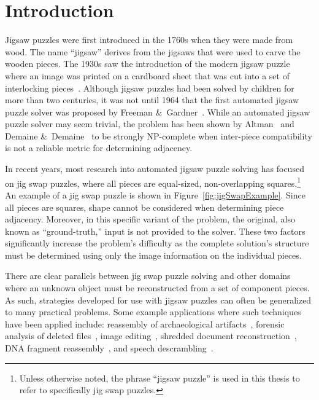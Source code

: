 \chapter{Introduction}\label{sec:introduction}

Jigsaw puzzles were first introduced in the 1760s when they were made from wood.  The name ``jigsaw'' derives from the jigsaws that were used to carve the wooden pieces.   The 1930s saw the introduction of the modern jigsaw puzzle where an image was printed on a cardboard sheet that was cut into a set of interlocking pieces~\cite{williams1990, williams2004}.  Although jigsaw puzzles had been solved by children for more than two centuries, it was not until 1964 that the first automated jigsaw puzzle solver was proposed by Freeman \&~Gardner~\cite{freeman1964}.  While an automated jigsaw puzzle solver may seem trivial, the problem has been shown by Altman~\cite{altman1990} and Demaine \&~Demaine~\cite{demaine2007} to be strongly NP-complete when inter-piece compatibility is not a reliable metric for determining adjacency.  

In recent years, most research into automated jigsaw puzzle solving has focused on jig swap puzzles, where all pieces are equal-sized, non-overlapping squares.\footnote{Unless otherwise noted, the phrase ``jigsaw puzzle'' is used in this thesis to refer to specifically jig swap puzzles.}  An example of a jig swap puzzle is shown in Figure~\ref{fig:jigSwapExample}.  Since all pieces are squares, shape cannot be considered when determining piece adjacency. Moreover, in this specific variant of the problem, the original, also known as ``ground-truth,'' input is not provided to the solver.  These two factors significantly increase the problem's difficulty as the complete solution's structure must be determined using only the image information on the individual pieces.

There are clear parallels between jig swap puzzle solving and other domains where an unknown object must be reconstructed from a set of component pieces.  As such, strategies developed for use with jigsaw puzzles can often be generalized to many practical problems.  Some example applications where such techniques have been applied include: reassembly of archaeological artifacts~\cite{brown2008, koller2006}, forensic analysis of deleted files~\cite{garfinkel2010}, image editing~\cite{cho2008}, shredded document reconstruction~\cite{zhu2008}, DNA fragment reassembly~\cite{marande2007}, and speech descrambling~\cite{zhao2007}. 

